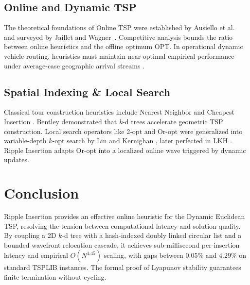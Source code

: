 \documentclass[11pt,a4paper]{article}
\theoremstyle{definition}
\begin{document}
\subsection{Online and Dynamic TSP}
The theoretical foundations of Online TSP were established by Ausiello et al.~\cite{ausiello2001online} and surveyed by Jaillet and Wagner~\cite{jaillet2008online}. Competitive analysis bounds the ratio between online heuristics and the offline optimum $\text{OPT}$. In operational dynamic vehicle routing, heuristics must maintain near-optimal empirical performance under average-case geographic arrival streams \cite{psaraftis1988dynamic}.

\subsection{Spatial Indexing \& Local Search}
Classical tour construction heuristics include Nearest Neighbor and Cheapest Insertion \cite{rosenkrantz1977analysis}. Bentley \cite{bentley1992fast} demonstrated that $k$-d trees accelerate geometric TSP construction. Local search operators like 2-opt \cite{croes1958method} and Or-opt \cite{or1976traveling} were generalized into variable-depth $k$-opt search by Lin and Kernighan \cite{lin1973effective}, later perfected in LKH \cite{helsgaun2000effective, helsgaun2017extension}. Ripple Insertion adapts Or-opt into a localized online wave triggered by dynamic updates.

\section{Conclusion}

Ripple Insertion provides an effective online heuristic for the Dynamic Euclidean TSP, resolving the tension between computational latency and solution quality. By coupling a 2D $k$-d tree with a hash-indexed doubly linked circular list and a bounded wavefront relocation cascade, it achieves sub-millisecond per-insertion latency and empirical $O(N^{1.45})$ scaling, with gaps between $0.05\%$ and $4.29\%$ on standard TSPLIB instances. The formal proof of Lyapunov stability guarantees finite termination without cycling.



\end{document}
